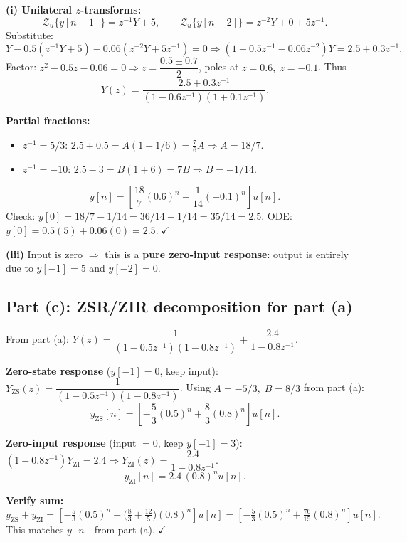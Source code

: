 \documentclass[11pt]{article}
\begin{document}
\textbf{(i) Unilateral $z$-transforms:}
\[
\mathcal{Z}_u\{y[n-1]\}=z^{-1}Y+5, \qquad \mathcal{Z}_u\{y[n-2]\}=z^{-2}Y+0+5z^{-1}.
\]
Substitute:
\[
Y-0.5(z^{-1}Y+5)-0.06(z^{-2}Y+5z^{-1})=0 \Rightarrow (1-0.5z^{-1}-0.06z^{-2})Y=2.5+0.3z^{-1}.
\]
Factor: $z^{2}-0.5z-0.06=0 \Rightarrow z=\dfrac{0.5\pm 0.7}{2}$, poles at $z=0.6,\;z=-0.1$. Thus
\[
Y(z)=\frac{2.5+0.3z^{-1}}{(1-0.6z^{-1})(1+0.1z^{-1})}.
\]

\textbf{Partial fractions:}
\begin{itemize}[leftmargin=*]
\item $z^{-1}=5/3$: $2.5+0.5=A(1+1/6)=\tfrac{7}{6}A\Rightarrow A=18/7$.
\item $z^{-1}=-10$: $2.5-3=B(1+6)=7B\Rightarrow B=-1/14$.
\end{itemize}
\begin{equation*}
\boxed{y[n]=\left[\dfrac{18}{7}(0.6)^{n}-\dfrac{1}{14}(-0.1)^{n}\right]u[n].}
\end{equation*}
Check: $y[0]=18/7-1/14=36/14-1/14=35/14=2.5$. ODE: $y[0]=0.5(5)+0.06(0)=2.5.\;\checkmark$

\textbf{(iii)} Input is zero $\Rightarrow$ this is a \textbf{pure zero-input response}: output is entirely due to $y[-1]=5$ and $y[-2]=0$.

\subsection*{Part (c): ZSR/ZIR decomposition for part (a)}
From part (a): $Y(z)=\dfrac{1}{(1-0.5z^{-1})(1-0.8z^{-1})}+\dfrac{2.4}{1-0.8z^{-1}}.$

\textbf{Zero-state response} ($y[-1]=0$, keep input): $Y_{\text{ZS}}(z)=\dfrac{1}{(1-0.5z^{-1})(1-0.8z^{-1})}$. Using $A=-5/3,\;B=8/3$ from part (a):
\begin{equation*}
\boxed{y_{\text{ZS}}[n]=\left[-\dfrac{5}{3}(0.5)^{n}+\dfrac{8}{3}(0.8)^{n}\right]u[n].}
\end{equation*}

\textbf{Zero-input response} (input $=0$, keep $y[-1]=3$): $(1-0.8z^{-1})Y_{\text{ZI}}=2.4\Rightarrow Y_{\text{ZI}}(z)=\dfrac{2.4}{1-0.8z^{-1}}$.
\begin{equation*}
\boxed{y_{\text{ZI}}[n]=2.4\,(0.8)^{n}u[n].}
\end{equation*}

\textbf{Verify sum:}
\[
y_{\text{ZS}}+y_{\text{ZI}}=\left[-\tfrac{5}{3}(0.5)^{n}+\bigl(\tfrac{8}{3}+\tfrac{12}{5}\bigr)(0.8)^{n}\right]u[n]=\left[-\tfrac{5}{3}(0.5)^{n}+\tfrac{76}{15}(0.8)^{n}\right]u[n].
\]
This matches $y[n]$ from part (a).$\;\checkmark$
\end{document}
